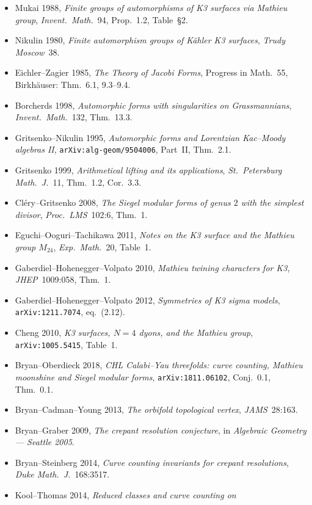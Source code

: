 \begin{itemize}
\item Mukai 1988, \emph{Finite groups of automorphisms of K3 surfaces
  via Mathieu group}, \emph{Invent.\ Math.}~94, Prop.~1.2, Table~\S2.
\item Nikulin 1980, \emph{Finite automorphism groups of K\"ahler K3
  surfaces}, \emph{Trudy Moscow}~38.
\item Eichler--Zagier 1985, \emph{The Theory of Jacobi Forms},
  Progress in Math.~55, Birkh\"auser: Thm.~6.1, 9.3--9.4.
\item Borcherds 1998, \emph{Automorphic forms with singularities on
  Grassmannians}, \emph{Invent.\ Math.}~132, Thm.~13.3.
\item Gritsenko--Nikulin 1995, \emph{Automorphic forms and Lorentzian
  Kac--Moody algebras II}, \texttt{arXiv:alg-geom/9504006}, Part~II,
  Thm.~2.1.
\item Gritsenko 1999, \emph{Arithmetical lifting and its applications},
  \emph{St.\ Petersburg Math.\ J.}~11, Thm.~1.2, Cor.~3.3.
\item Cl\'ery--Gritsenko 2008, \emph{The Siegel modular forms of genus
  $2$ with the simplest divisor}, \emph{Proc.\ LMS}~102:6, Thm.~1.
\item Eguchi--Ooguri--Tachikawa 2011, \emph{Notes on the K3 surface and
  the Mathieu group $M_{24}$}, \emph{Exp.\ Math.}~20, Table~1.
\item Gaberdiel--Hohenegger--Volpato 2010, \emph{Mathieu twining
  characters for K3}, \emph{JHEP}~1009:058, Thm.~1.
\item Gaberdiel--Hohenegger--Volpato 2012, \emph{Symmetries of K3
  sigma models}, \texttt{arXiv:1211.7074}, eq.~(2.12).
\item Cheng 2010, \emph{K3 surfaces, $N=4$ dyons, and the Mathieu group},
  \texttt{arXiv:1005.5415}, Table~1.
\item Bryan--Oberdieck 2018, \emph{CHL Calabi--Yau threefolds: curve
  counting, Mathieu moonshine and Siegel modular forms},
  \texttt{arXiv:1811.06102}, Conj.~0.1, Thm.~0.1.
\item Bryan--Cadman--Young 2013, \emph{The orbifold topological vertex},
  \emph{JAMS}~28:163.
\item Bryan--Graber 2009, \emph{The crepant resolution conjecture},
  in \emph{Algebraic Geometry --- Seattle 2005}.
\item Bryan--Steinberg 2014, \emph{Curve counting invariants for crepant
  resolutions}, \emph{Duke Math.\ J.}~168:3517.
\item Kool--Thomas 2014, \emph{Reduced classes and curve counting on
}
\end{itemize}
